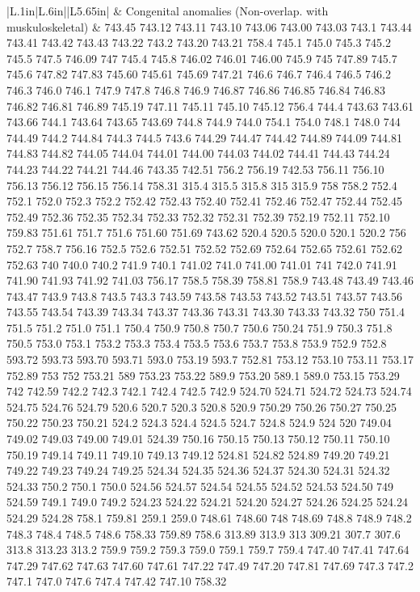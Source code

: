 \begin{longtable}{|L{.1in}|L{.6in}||L{5.65in}|}
    & Congenital  anomalies (Non-overlap. with muskuloskeletal)  &  743.45 743.12 743.11 743.10 743.06 743.00 743.03 743.1 743.44 743.41 743.42 743.43 743.22 743.2 743.20 743.21 758.4 745.1 745.0 745.3 745.2 745.5 747.5 746.09 747 745.4 745.8 746.02 746.01 746.00 745.9 745 747.89 745.7 745.6 747.82 747.83 745.60 745.61 745.69 747.21 746.6 746.7 746.4 746.5 746.2 746.3 746.0 746.1 747.9 747.8 746.8 746.9 746.87 746.86 746.85 746.84 746.83 746.82 746.81 746.89 745.19 747.11 745.11 745.10 745.12 756.4 744.4 743.63 743.61 743.66 744.1 743.64 743.65 743.69 744.8 744.9 744.0 754.1 754.0 748.1 748.0 744 744.49 744.2 744.84 744.3 744.5 743.6 744.29 744.47 744.42 744.89 744.09 744.81 744.83 744.82 744.05 744.04 744.01 744.00 744.03 744.02 744.41 744.43 744.24 744.23 744.22 744.21 744.46 743.35 742.51 756.2 756.19 742.53 756.11 756.10 756.13 756.12 756.15 756.14 758.31 315.4 315.5 315.8 315 315.9 758 758.2 752.4 752.1 752.0 752.3 752.2 752.42 752.43 752.40 752.41 752.46 752.47 752.44 752.45 752.49 752.36 752.35 752.34 752.33 752.32 752.31 752.39 752.19 752.11 752.10 759.83 751.61 751.7 751.6 751.60 751.69 743.62 520.4 520.5 520.0 520.1 520.2 756 752.7 758.7 756.16 752.5 752.6 752.51 752.52 752.69 752.64 752.65 752.61 752.62 752.63 740 740.0 740.2 741.9 740.1 741.02 741.0 741.00 741.01 741 742.0 741.91 741.90 741.93 741.92 741.03 756.17 758.5 758.39 758.81 758.9 743.48 743.49 743.46 743.47 743.9 743.8 743.5 743.3 743.59 743.58 743.53 743.52 743.51 743.57 743.56 743.55 743.54 743.39 743.34 743.37 743.36 743.31 743.30 743.33 743.32 750 751.4 751.5 751.2 751.0 751.1 750.4 750.9 750.8 750.7 750.6 750.24 751.9 750.3 751.8 750.5 753.0 753.1 753.2 753.3 753.4 753.5 753.6 753.7 753.8 753.9 752.9 752.8 593.72 593.73 593.70 593.71 593.0 753.19 593.7 752.81 753.12 753.10 753.11 753.17 752.89 753 752 753.21 589 753.23 753.22 589.9 753.20 589.1 589.0 753.15 753.29 742 742.59 742.2 742.3 742.1 742.4 742.5 742.9 524.70 524.71 524.72 524.73 524.74 524.75 524.76 524.79 520.6 520.7 520.3 520.8 520.9 750.29 750.26 750.27 750.25 750.22 750.23 750.21 524.2 524.3 524.4 524.5 524.7 524.8 524.9 524 520 749.04 749.02 749.03 749.00 749.01 524.39 750.16 750.15 750.13 750.12 750.11 750.10 750.19 749.14 749.11 749.10 749.13 749.12 524.81 524.82 524.89 749.20 749.21 749.22 749.23 749.24 749.25 524.34 524.35 524.36 524.37 524.30 524.31 524.32 524.33 750.2 750.1 750.0 524.56 524.57 524.54 524.55 524.52 524.53 524.50 749 524.59 749.1 749.0 749.2 524.23 524.22 524.21 524.20 524.27 524.26 524.25 524.24 524.29 524.28 758.1 759.81 259.1 259.0 748.61 748.60 748 748.69 748.8 748.9 748.2 748.3 748.4 748.5 748.6 758.33 759.89 758.6 313.89 313.9 313 309.21 307.7 307.6 313.8 313.23 313.2 759.9 759.2 759.3 759.0 759.1 759.7 759.4 747.40 747.41 747.64 747.29 747.62 747.63 747.60 747.61 747.22 747.49 747.20 747.81 747.69 747.3 747.2 747.1 747.0 747.6 747.4 747.42 747.10 758.32\\\hline

\end{longtable}
